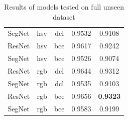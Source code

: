 \begin{table}[!h]
{\begin{tabular}{|c||c|c|c|c|}
            SegNet & hsv & dcl & 0.9532 & 0.9108 \\
            ResNet & hsv & bce & 0.9617 & 0.9242 \\
            SegNet & hsv & bce & 0.9526 & 0.9074 \\
            \hline
            ResNet & rgb & dcl & 0.9644 & 0.9312 \\
            SegNet & rgb & dcl & 0.9535 & 0.9103 \\
            ResNet & rgb & bce & 0.9656 & \textbf{0.9323} \\
            SegNet & rgb & bce & 0.9583 & 0.9199 \\
            \hline
    	\end{tabular}
    }
    \caption[Results of models tested on unseen dataset]{Results of models tested on full unseen dataset}
    \label{tab:opposite_datasets}
\end{table}
